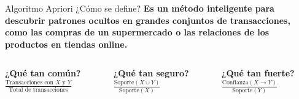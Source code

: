 \documentclass{beamer}
\begin{document}
\begin{frame}{Algoritmo Apriori ¿Cómo se define?}
    \textbf{Es un método inteligente para descubrir patrones ocultos en grandes conjuntos de transacciones, como las compras de un supermercado o las relaciones de los productos en tiendas online.}
    
    \vspace{0.5cm}
    \begin{columns}[T]
        \begin{column}{0.33\textwidth}
            \begin{tcolorbox}[colback=apriori-blue!20, colframe=apriori-blue, title=\textbf{Soporte}]
                \centering
                \small
                \textbf{¿Qué tan común?}\\
                \vspace{0.2cm}
                $\frac{\text{Transacciones con }X\text{ y }Y}{\text{Total de transacciones}}$
            \end{tcolorbox}
        \end{column}
        
        \begin{column}{0.33\textwidth}
            \begin{tcolorbox}[colback=apriori-orange!20, colframe=apriori-orange, title=\textbf{Confianza}]
                \centering
                \small
                \textbf{¿Qué tan seguro?}\\
                \vspace{0.2cm}
                $\frac{\text{Soporte}(X \cup Y)}{\text{Soporte}(X)}$
            \end{tcolorbox}
        \end{column}
        
        \begin{column}{0.33\textwidth}
            \begin{tcolorbox}[colback=apriori-green!20, colframe=apriori-green, title=\textbf{Lift}]
                \centering
                \small
                \textbf{¿Qué tan fuerte?}\\
                \vspace{0.2cm}
                $\frac{\text{Confianza}(X \rightarrow Y)}{\text{Soporte}(Y)}$
            \end{tcolorbox}
        \end{column}
    \end{columns}
\end{frame}
\end{document}
